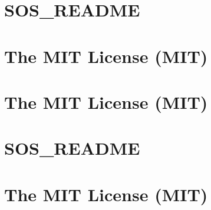 \documentclass[twoside]{book}
\newcommand{\+}{\discretionary{\mbox{\scriptsize$\hookleftarrow$}}{}{}}
\begin{document}
\chapter{SOS\+\_\+\+README}
\label{md__d___source_shev4enkoyar__digital_twin__web_client_bin__release_netcoreapp3_1_publish__s_o_s__r_e_a_d_m_e}

\chapter{The MIT License (MIT)}
\label{md__d___source_shev4enkoyar__digital_twin__web_client_bin__release_netcoreapp3_1_publish_wwwroot734a44db047c4ec89d3aa98f83533cce}

\chapter{The MIT License (MIT)}
\label{md__d___source_shev4enkoyar__digital_twin__web_client_bin__release_netcoreapp3_1_publish_wwwroot7517f314e816b662b6cb2b03d248732a}

\chapter{SOS\+\_\+\+README}
\label{md__d___source_shev4enkoyar__digital_twin__web_client_obj__debug_netcoreapp3_1_linux_x64__pub_tmp__out__s_o_s__r_e_a_d_m_e}

\chapter{The MIT License (MIT)}
\label{md__d___source_shev4enkoyar__digital_twin__web_client_obj__debug_netcoreapp3_1_linux_x64__pub_tm24dead30f5939fa1dd445284a3222d0d}

\end{document}
